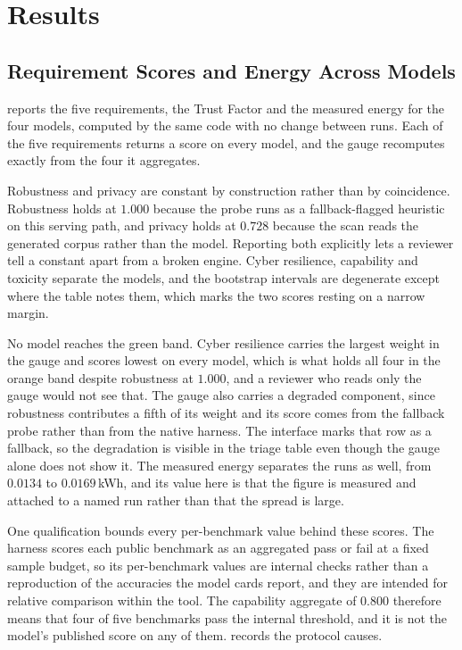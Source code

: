 \documentclass[10pt,conference,a4paper]{IEEEtran}
\begin{document}
\section{Results}
\label{sec:results}

\subsection{Requirement Scores and Energy Across Models}
\label{sec:panelresults}
 reports the five requirements, the Trust Factor and the measured energy for the four models, computed by the same code with no change between runs.
Each of the five requirements returns a score on every model, and the gauge recomputes exactly from the four it aggregates.

Robustness and privacy are constant by construction rather than by coincidence.
Robustness holds at $1.000$ because the probe runs as a fallback-flagged heuristic on this serving path, and privacy holds at $0.728$ because the scan reads the generated corpus rather than the model.
Reporting both explicitly lets a reviewer tell a constant apart from a broken engine.
Cyber resilience, capability and toxicity separate the models, and the bootstrap intervals are degenerate except where the table notes them, which marks the two scores resting on a narrow margin.

No model reaches the green band.
Cyber resilience carries the largest weight in the gauge and scores lowest on every model, which is what holds all four in the orange band despite robustness at $1.000$, and a reviewer who reads only the gauge would not see that.
The gauge also carries a degraded component, since robustness contributes a fifth of its weight and its score comes from the fallback probe rather than from the native harness.
The interface marks that row as a fallback, so the degradation is visible in the triage table even though the gauge alone does not show it.
The measured energy separates the runs as well, from $0.0134$ to $0.0169$\,kWh, and its value here is that the figure is measured and attached to a named run rather than that the spread is large.

One qualification bounds every per-benchmark value behind these scores.
The harness scores each public benchmark as an aggregated pass or fail at a fixed sample budget, so its per-benchmark values are internal checks rather than a reproduction of the accuracies the model cards report, and they are intended for relative comparison within the tool.
The capability aggregate of $0.800$ therefore means that four of five benchmarks pass the internal threshold, and it is not the model's published score on any of them.
 records the protocol causes.
\end{document}

